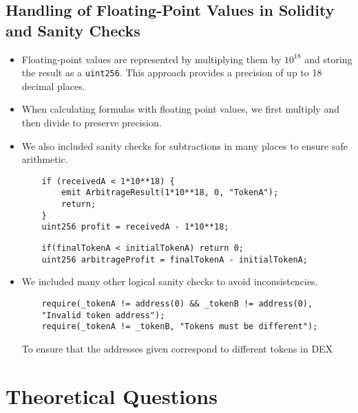 \documentclass[12pt,a4paper]{article}
\begin{document}
\subsection*{Handling of Floating-Point Values in Solidity and Sanity Checks}

\begin{itemize}
    \item 
Floating-point values are represented by multiplying them by $10^{18}$ and storing the result as a \texttt{uint256}. This approach provides a precision of up to 18 decimal places. \\
\item When calculating formulas with floating point values, we first multiply and then divide to preserve precision. \\
\item We also included sanity checks for subtractions in many places to ensure safe arithmetic.
\begin{listing}[H]
\begin{verbatim}
    if (receivedA < 1*10**18) {
        emit ArbitrageResult(1*10**18, 0, "TokenA");
        return;
    }
    uint256 profit = receivedA - 1*10**18;
\end{verbatim}
\end{listing}
\begin{listing}[H]
\begin{verbatim}
    if(finalTokenA < initialTokenA) return 0;
    uint256 arbitrageProfit = finalTokenA - initialTokenA;
\end{verbatim}
\end{listing}
\item We included many other logical sanity checks to avoid inconsistencies.

\begin{listing}[H]
\begin{verbatim}
    require(_tokenA != address(0) && _tokenB != address(0), 
    "Invalid token address");
    require(_tokenA != _tokenB, "Tokens must be different");
\end{verbatim}
\caption*{To ensure that the addresses given correspond to different tokens in DEX}
\end{listing}
\end{itemize}


\newpage
\section*{Theoretical Questions}
\end{document}
